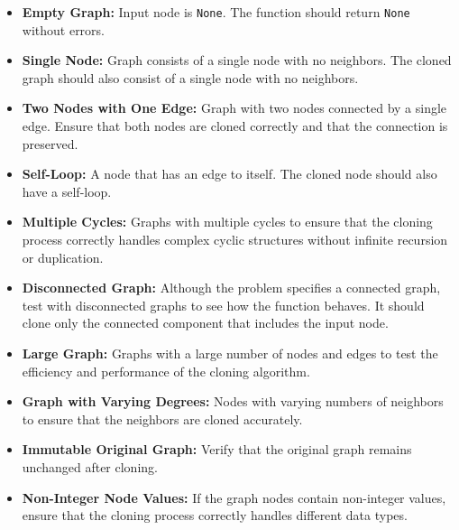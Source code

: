 \begin{itemize}
    \item \textbf{Empty Graph:} Input node is \texttt{None}. The function should return \texttt{None} without errors.
    
    \item \textbf{Single Node:} Graph consists of a single node with no neighbors. The cloned graph should also consist of a single node with no neighbors.
    
    \item \textbf{Two Nodes with One Edge:} Graph with two nodes connected by a single edge. Ensure that both nodes are cloned correctly and that the connection is preserved.
    
    \item \textbf{Self-Loop:} A node that has an edge to itself. The cloned node should also have a self-loop.
    
    \item \textbf{Multiple Cycles:} Graphs with multiple cycles to ensure that the cloning process correctly handles complex cyclic structures without infinite recursion or duplication.
    
    \item \textbf{Disconnected Graph:} Although the problem specifies a connected graph, test with disconnected graphs to see how the function behaves. It should clone only the connected component that includes the input node.
    
    \item \textbf{Large Graph:} Graphs with a large number of nodes and edges to test the efficiency and performance of the cloning algorithm.
    
    \item \textbf{Graph with Varying Degrees:} Nodes with varying numbers of neighbors to ensure that the neighbors are cloned accurately.
    
    \item \textbf{Immutable Original Graph:} Verify that the original graph remains unchanged after cloning.
    
    \item \textbf{Non-Integer Node Values:} If the graph nodes contain non-integer values, ensure that the cloning process correctly handles different data types.
\end{itemize}

\printindex